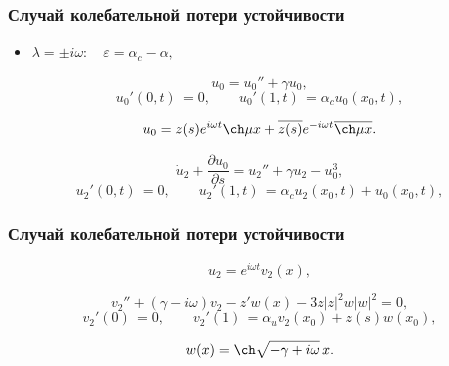 \documentclass[fullscreen=true, unicode, bookmarks=false]{beamer}
\begin{document}
\begin{frame}
\frametitle{ Случай колебательной потери устойчивости }

\begin{itemize}
\item { $ \lambda = \pm i \omega: \quad \varepsilon=\alpha_c-\alpha, $
}
\end{itemize}

\medskip

\begin{equation}
	u_0 = u_0'' + \gamma u_0,
\end{equation}
\begin{equation}
	u_0'(0, t) \, = 0, \qquad u_0'(1, t) \, = \alpha_c u_0(x_0, t),
\end{equation}

$$ u_0 = z(s) e^{i \omega t} \ch \mu x + \overline{z(s)} e^{-i \omega t} \overline{\ch \mu x}. $$

\medskip

\begin{equation}
	\dot u_2 + \frac{\partial u_0}{\partial s} = u_2'' + \gamma u_2 - u_0^3,
\end{equation}
\begin{equation}
	u_2'(0, t) \, = 0, \qquad u_2'(1, t) \, = \alpha_c u_2(x_0, t) + u_0(x_0, t),
\end{equation}


\end{frame}

\begin{frame}
\frametitle{ Случай колебательной потери устойчивости }

$$ u_2 = e^{i \omega t} v_2(x), $$

\bigskip

\begin{equation}
	v_2'' + (\gamma - i \omega) v_2 - z' w(x) - 3z|z|^2 w|w|^2 = 0,
\end{equation}
\begin{equation}
	v_2'(0) \, = 0, \qquad v_2'(1) \, = \alpha_u v_2(x_0) + z(s) w(x_0),
\end{equation}

$$ w(x) = \ch \sqrt{-\gamma + i \omega} \, x. $$

\end{frame}
\end{document}

